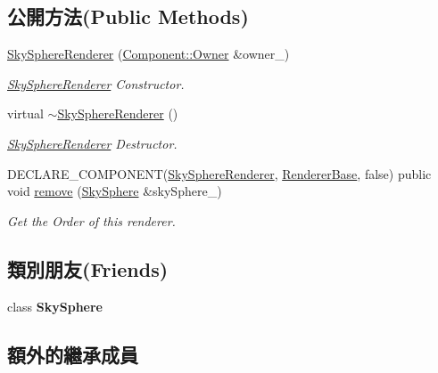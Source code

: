 \subsection*{公開方法(Public Methods)}
\begin{DoxyCompactItemize}
\item 
\hyperlink{class_magnum_1_1_sky_sphere_renderer_a9aed4d21b3a24a99a7bd0ff0578444db}{Sky\+Sphere\+Renderer} (\hyperlink{class_magnum_1_1_component_1_1_owner}{Component\+::\+Owner} \&owner\+\_\+)
\begin{DoxyCompactList}\small\item\em \hyperlink{class_magnum_1_1_sky_sphere_renderer}{Sky\+Sphere\+Renderer} Constructor. \end{DoxyCompactList}\item 
virtual \hyperlink{class_magnum_1_1_sky_sphere_renderer_a09e3b09dd3065cdc1f67abbe7a3438f0}{$\sim$\+Sky\+Sphere\+Renderer} ()
\begin{DoxyCompactList}\small\item\em \hyperlink{class_magnum_1_1_sky_sphere_renderer}{Sky\+Sphere\+Renderer} Destructor. \end{DoxyCompactList}\item 
D\+E\+C\+L\+A\+R\+E\+\_\+\+C\+O\+M\+P\+O\+N\+E\+NT(\hyperlink{class_magnum_1_1_sky_sphere_renderer}{Sky\+Sphere\+Renderer}, \hyperlink{class_magnum_1_1_renderer_base}{Renderer\+Base}, false) public void \hyperlink{class_magnum_1_1_sky_sphere_renderer_a2b7bd339a31bebd9c1770d591ad5f28f}{remove} (\hyperlink{class_magnum_1_1_sky_sphere}{Sky\+Sphere} \&sky\+Sphere\+\_\+)
\begin{DoxyCompactList}\small\item\em Get the Order of this renderer. \end{DoxyCompactList}\end{DoxyCompactItemize}
\subsection*{類別朋友(Friends)}
\begin{DoxyCompactItemize}
\item 
class {\bfseries Sky\+Sphere}\hypertarget{class_magnum_1_1_sky_sphere_renderer_a20c9006b9245239c28d32c7e919bd6c6}{}\label{class_magnum_1_1_sky_sphere_renderer_a20c9006b9245239c28d32c7e919bd6c6}

\end{DoxyCompactItemize}
\subsection*{額外的繼承成員}


